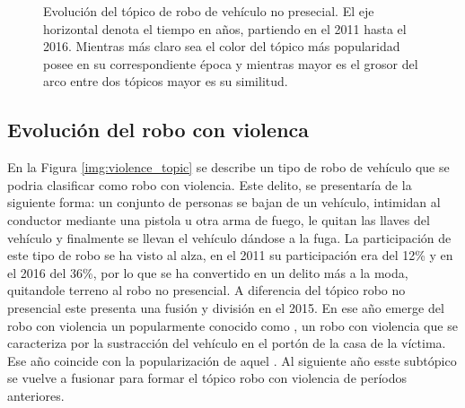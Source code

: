 \begin{figure}
\caption{Evolución del tópico de robo de vehículo no presecial. El eje horizontal denota el tiempo en años, partiendo en el 2011 hasta el 2016. Mientras más claro sea el color del tópico más popularidad posee en su correspondiente época y mientras mayor es el grosor del arco entre dos tópicos mayor es su similitud.}
\label{img:noviolence_topic}
\end{figure}

\subsection{Evolución del robo con violenca}
\label{sec:violence_topic}

En la Figura \ref{img:violence_topic} se describe un tipo de robo de vehículo que se podria clasificar como robo con violencia. Este delito, se presentaría de la siguiente forma: un conjunto de personas se bajan de un vehículo, intimidan al conductor mediante una pistola u otra arma de fuego, le quitan las llaves del vehículo y finalmente se llevan el vehículo dándose a la fuga. La participación de este tipo de robo se ha visto al alza, en el 2011 su participación era del 12\% y en el 2016 del 36\%, por lo que se ha convertido en un delito más a la moda, quitandole terreno al robo no presencial. A diferencia del tópico robo no presencial este presenta una fusión y división en el 2015. En ese año emerge del robo con violencia un  popularmente conocido como , un robo con violencia que se caracteriza por la sustracción del vehículo en el portón de la casa de la víctima. Ese año coincide con la popularización de aquel . Al siguiente año esste subtópico se vuelve a fusionar para formar el tópico robo con violencia de períodos anteriores.


